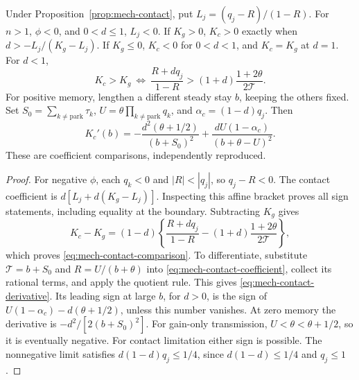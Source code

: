 \begin{lemma}\label{lem:mech-contact-consequences}
Under Proposition~\ref{prop:mech-contact}, put \(L_j=(q_j-R)/(1-R)\). For \(n>1\), \(\phi<0\), and \(0<d\leq1\), \(L_j<0\). If \(K_g>0\), \(K_c>0\) exactly when \(d>-L_j/(K_g-L_j)\). If \(K_g\leq0\), \(K_c<0\) for \(0<d<1\), and \(K_c=K_g\) at \(d=1\). For \(d<1\),
\begin{equation}\label{eq:mech-contact-comparison}
 K_c>K_g\ \Longleftrightarrow\
 \frac{R+dq_j}{1-R}>(1+d)\frac{1+2\theta}{2\mathcal T}.
\end{equation}
For positive memory, lengthen a different steady stay \(b\), keeping the others fixed. Set \(S_0=\sum_{k\ne\mathrm{park}}\tau_k\), \(U=\theta\prod_{k\ne\mathrm{park}}q_k\), and \(\alpha_c=(1-d)q_j\). Then
\begin{equation}\label{eq:mech-contact-derivative}
 K_c'(b)=-\frac{d^2(\theta+1/2)}{(b+S_0)^2}
 +\frac{dU(1-\alpha_c)}{(b+\theta-U)^2}.
\end{equation}
These are coefficient comparisons, independently reproduced.
\end{lemma}
\begin{proof}
For negative \(\phi\), each \(q_k<0\) and \(|R|<|q_j|\), so \(q_j-R<0\). The contact coefficient is \(d[L_j+d(K_g-L_j)]\). Inspecting this affine bracket proves all sign statements, including equality at the boundary. Subtracting \(K_g\) gives
\[
 K_c-K_g=(1-d)\left\{\frac{R+dq_j}{1-R}
 -(1+d)\frac{1+2\theta}{2\mathcal T}\right\},
\]
which proves \eqref{eq:mech-contact-comparison}. To differentiate, substitute \(\mathcal T=b+S_0\) and \(R=U/(b+\theta)\) into \eqref{eq:mech-contact-coefficient}, collect its rational terms, and apply the quotient rule. This gives \eqref{eq:mech-contact-derivative}. Its leading sign at large \(b\), for \(d>0\), is the sign of \(U(1-\alpha_c)-d(\theta+1/2)\), unless this number vanishes. At zero memory the derivative is \(-d^2/[2(b+S_0)^2]\). For gain-only transmission, \(U<\theta<\theta+1/2\), so it is eventually negative. For contact limitation either sign is possible. The nonnegative limit satisfies \(d(1-d)q_j\leq1/4\), since \(d(1-d)\leq1/4\) and \(q_j\leq1\).
\end{proof}

